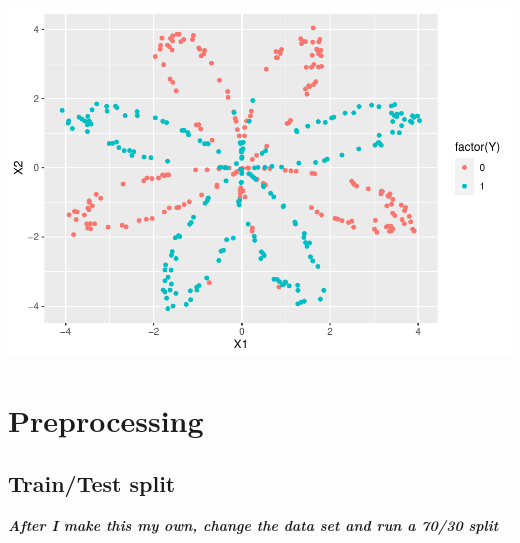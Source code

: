 \begin{Shaded}
\begin{Highlighting}[]
\OtherTok{\textless{}{-}} \NormalTok{(}
  \OtherTok{\textless{}{-}} \NormalTok{(}\NormalTok{,}\NormalTok{,}\NormalTok{)}
\NormalTok{\}}


\OtherTok{\textless{}{-}} \NormalTok{()}


\NormalTok{(} \SpecialCharTok{+}
  \NormalTok{()}
\end{Highlighting}
\end{Shaded}

\includegraphics{BabyNeuralNet_files/unnamed-chunk-1-1.pdf}

\hypertarget{preprocessing}{%
\section{Preprocessing}\label{preprocessing}}

\hypertarget{traintest-split}{%
\subsection{Train/Test split}\label{traintest-split}}

\textbf{\emph{After I make this my own, change the data set and run a
70/30 split}}

